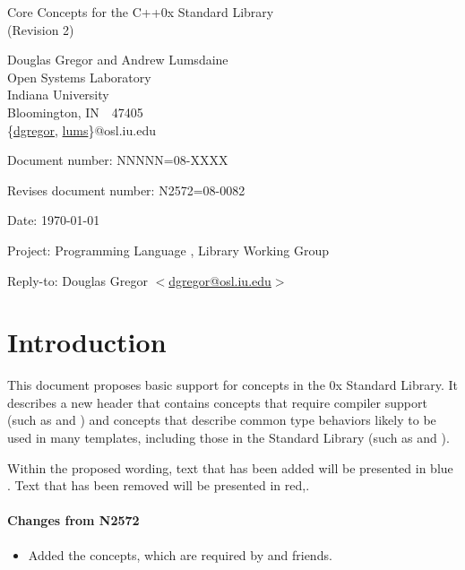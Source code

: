 \documentclass[american,twoside]{book}
\begin{document}
\raggedbottom

\begin{titlepage}
\begin{center}
\huge
Core Concepts for the C++0x Standard Library\\
(Revision 2)
\vspace{0.25in}

\normalsize
Douglas Gregor and Andrew Lumsdaine \\
Open Systems Laboratory \\
Indiana University \\
Bloomington, IN\ \  47405 \\
\{\href{mailto:dgregor@osl.iu.edu}{dgregor}, \href{mailto:lums@osl.iu.edu}{lums}\}@osl.iu.edu
\end{center}

\vspace{0.25in}
\par\noindent Document number: NNNNN=08-XXXX\vspace{-6pt}
\par\noindent Revises document number: N2572=08-0082\vspace{-6pt}
\par\noindent Date: \today\vspace{-6pt}
\par\noindent Project: Programming Language \Cpp{}, Library Working Group\vspace{-6pt}
\par\noindent Reply-to: Douglas Gregor $<$\href{mailto:dgregor@osl.iu.edu}{dgregor@osl.iu.edu}$>$\vspace{-6pt}

\section*{Introduction}
This document proposes basic support for concepts in the \Cpp0x
Standard Library. It describes a new header  that
contains concepts that require compiler support (such as
 and ) and concepts that describe
common type behaviors likely to be used in many templates, including
those in the Standard Library (such as  and
). 

Within the proposed wording, text that has been added
\textcolor{addclr}{will be presented in blue} . Text that has been removed will be
presented \textcolor{remclr}{in red},.  


\paragraph*{Changes from N2572}
\begin{itemize}
\item Added the  concepts, which are required by
   and friends.
\end{itemize}

\end{titlepage}
\end{document}
